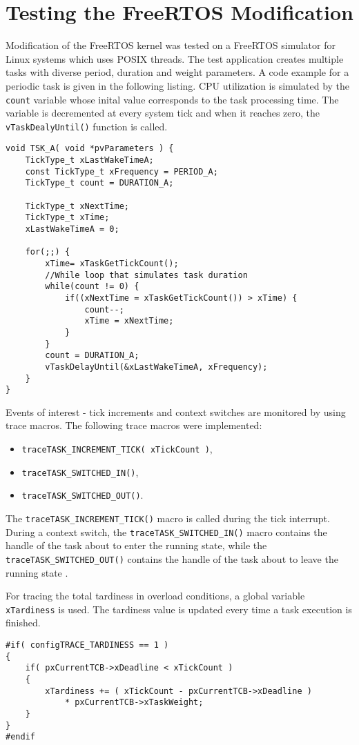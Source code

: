\section{Testing the FreeRTOS Modification}
Modification of the FreeRTOS kernel was tested on a FreeRTOS simulator for Linux systems which uses POSIX threads.
The test application creates multiple tasks with diverse period, duration and weight parameters. 
A code example for a periodic task is given in the following listing.
CPU utilization is simulated by the \verb$count$ variable whose inital value corresponds to the task processing time. 
The variable is decremented at every system tick and when it reaches zero, the \verb$vTaskDealyUntil()$ function is called. 
\begin{lstlisting}[frame=none, label={periodic_task_freertos}, caption={Task function simulating a periodic task.}, captionpos=b]
void TSK_A( void *pvParameters ) {
    TickType_t xLastWakeTimeA;
    const TickType_t xFrequency = PERIOD_A;
    TickType_t count = DURATION_A;

    TickType_t xNextTime;
    TickType_t xTime;
    xLastWakeTimeA = 0;
    
    for(;;) {
        xTime= xTaskGetTickCount();
        //While loop that simulates task duration
        while(count != 0) {
            if((xNextTime = xTaskGetTickCount()) > xTime) {
                count--;
                xTime = xNextTime;
            }
        }
        count = DURATION_A;
        vTaskDelayUntil(&xLastWakeTimeA, xFrequency);
    }
}
\end{lstlisting}
Events of interest - tick increments and context switches are monitored by using trace macros. 
The following trace macros were implemented:
\begin{itemize}
	\item \verb$traceTASK_INCREMENT_TICK( xTickCount )$,
	\item \verb$traceTASK_SWITCHED_IN()$,
	\item \verb$traceTASK_SWITCHED_OUT()$.
\end{itemize}
The \verb$traceTASK_INCREMENT_TICK()$ macro is called during the tick interrupt.
During a context switch, the \verb$traceTASK_SWITCHED_IN()$ macro contains the handle of the task about to enter the running state, while the \verb$traceTASK_SWITCHED_OUT()$ contains the handle of the task about to leave the running state \cite{freertosref}. 

For tracing the total tardiness in overload conditions, a global variable \verb$xTardiness$ is used.
The tardiness value is updated every time a task execution is finished.
\begin{lstlisting}[frame=none, label={tardiness}, caption={Updating the \texttt{xTardiness} variable.}, captionpos=b]
#if( configTRACE_TARDINESS == 1 )
{
	if( pxCurrentTCB->xDeadline < xTickCount )
	{
		xTardiness += ( xTickCount - pxCurrentTCB->xDeadline ) 
			* pxCurrentTCB->xTaskWeight;
	}
}
#endif
\end{lstlisting}

